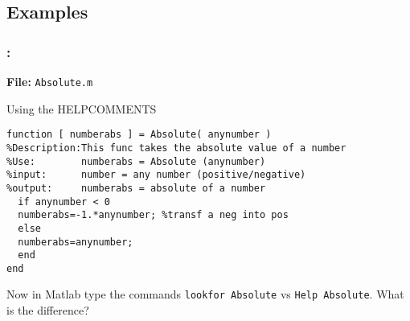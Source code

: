 \documentclass[11pt]{beamer}
\begin{document}
\subsection{Examples}
\begin{frame}[fragile]
	
	\frametitle{\secname : \subsecname}
\vspace{-5pt}
\textbf{File:} \verb|Absolute.m|
\begin{exampleblock}{Using the HELPCOMMENTS}
\begin{verbatim}
function [ numberabs ] = Absolute( anynumber )
%Description:This func takes the absolute value of a number
%Use:        numberabs = Absolute (anynumber)
%input:      number = any number (positive/negative)
%output:     numberabs = absolute of a number
  if anynumber < 0
  numberabs=-1.*anynumber; %transf a neg into pos
  else
  numberabs=anynumber;
  end
end
	\end{verbatim}
\end{exampleblock}	
\vspace{-5pt}
\begin{block}{}
	Now in Matlab type the commands \verb|lookfor Absolute| vs \verb|Help Absolute|. What is the difference?
\end{block}
		
\end{frame}
\end{document}
